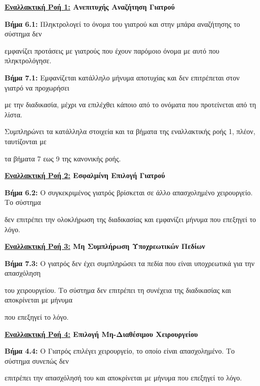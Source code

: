 \documentclass{article}
\begin{document}
  \textbf{\underline{Εναλλακτική Ροή 1:} Ανεπιτυχής Αναζήτηση Γιατρού} \vspace{0.2cm} 
\par \textbf{Βήμα 6.1:} Πληκτρολογεί το όνομα του γιατρού και στην μπάρα αναζήτησης το σύστημα δεν \par εμφανίζει προτάσεις με γιατρούς που έχουν παρόμοιο όνομα με αυτό που πληκτρολόγησε. \vspace{0.1cm}
\par \textbf{Βήμα 7.1:} Εμφανίζεται κατάλληλο μήνυμα αποτυχίας και δεν επιτρέπεται στον γιατρό να προχωρήσει \par με την διαδικασία, μέχρι να επιλέχθει κάποιο από το ονόματα που προτείνεται από τη λίστα.\vspace{0.1cm}
\par Συμπληρώνει τα κατάλληλα στοιχεία και τα βήματα της εναλλακτικής ροής 1, πλέον, ταυτίζονται με \par τα βήματα 7 εως 9 της κανονικής ροής. \vspace{0.2cm}

\textbf{\underline{Εναλλακτική Ροή 2:} Εσφαλμένη Επιλογή Γιατρού} \vspace{0.2cm} 

\par \textbf{Βήμα 6.2:} Ο συγκεκριμένος γιατρός βρίσκεται σε άλλο απασχολημένο χειρουργείο. Το σύστημα \par δεν επιτρέπει την ολοκλήρωση της διαδικασίας και εμφανίζει μήνυμα που επεξηγεί το λόγο. \vspace{0.2cm}

\textbf{\underline{Εναλλακτική Ροή 3:} Μη Συμπλήρωση Υποχρεωτικών Πεδίων} \vspace{0.2cm} 
\par \textbf{Βήμα 7.3:} Ο γιατρός δεν έχει συμπληρώσει τα πεδία που είναι υποχρεωτικά για την απασχόληση \par του χειρουργείου. Το σύστημα δεν επιτρέπει τη συνέχεια της διαδικασίας και αποκρίνεται με μήνυμα \par που επεξηγεί το λόγο.\vspace{0.2cm}

\textbf{\underline{Εναλλακτική Ροή 4:} Επιλογή Μη-Διαθέσιμου Χειρουργείου} \vspace{0.2cm} 
\par \textbf{Βήμα 4.4:} Ο Γιατρός επιλέγει χειρουργείο, το οποίο είναι απασχολημένο. Το σύστημα συνεπώς δεν \par επιτρέπει την απασχόλησή του και αποκρίνεται με μήνυμα που επεξηγεί το λόγο.
\end{document}
